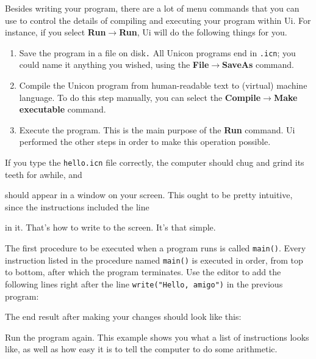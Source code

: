 Besides writing your program, there are a lot of menu commands that you can use
to control the details of compiling and executing your program within Ui. For
instance, if you select \textbf{Run$\to$Run}, Ui will do the following
things for you.
\begin{enumerate}
  \item Save the program in a file on disk\texttt{.}  All Unicon programs end
    in \texttt{.icn}; you could name it anything you wished, using the
    \textbf{File$\to$SaveAs} command.
  \item Compile the Unicon program from human-readable text to (virtual)
    machine language. To do this step manually, you can select the
    \textbf{Compile$\to$Make executable} command.
  \item Execute the program. This is the main purpose of the \textbf{Run}
    command. Ui performed the other steps in order to make this operation
    possible.
\end{enumerate}
If you type the \texttt{hello.icn} file correctly, the computer should
chug and grind its teeth for awhile, and


\noindent should appear in a window on your screen. This ought to be pretty
intuitive, since the instructions included the line


\noindent in it. That's how to write to the screen.
It's that simple.

The first procedure to be executed when a program runs is called
\texttt{main()}. Every instruction listed in the procedure named
\texttt{main()} is executed in order, from top to bottom, after which
the program terminates. Use the editor to add the following lines right
after the line \texttt{write("Hello,
amigo")} in the previous program:


\noindent The end result after making your changes should look like this:


Run the program again. This example shows you what a list of
instructions looks like, as well as how easy it is to tell the computer
to do some arithmetic.

